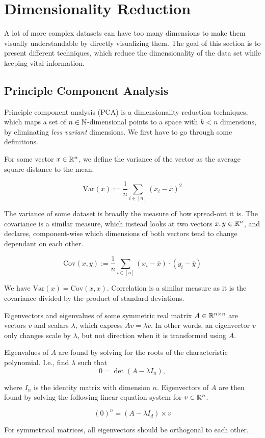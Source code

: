\section{Dimensionality Reduction}
A lot of more complex datasets can have too many dimensions to make them visually understandable by directly visualizing them.
The goal of this section is to present different techniques, which reduce the dimensionality of the data set while keeping vital information.

\subsection{Principle Component Analysis}
Principle component analysis (PCA) is a dimensionality reduction techniques, which maps a set of \(n \in \mathbb N\)-dimensional points to a space with \(k < n\) dimensions, by eliminating \emph{less variant} dimensions.
We first have to go through some definitions.

\newcommand{\Var}{\text{Var}}
\newcommand{\Cov}{\text{Cov}}

\begin{definition}
    For some vector \(x \in \mathbb R^n\), we define the variance of the vector as the average square distance to the mean.

    \[\Var(x) := \frac{1}{n}\sum_{i \in [n]} (x_i - \overline x)^2\]

    \noindent
    The variance of some dataset is broadly the measure of how spread-out it is.
    The covariance is a similar measure, which instead looks at two vectors \(x, y \in \mathbb R^n\), and declares, component-wise which dimensions of both vectors tend to change dependant on each other.

    \[\Cov(x, y) := \frac{1}{n}\sum_{i \in [n]} (x_i - \overline x) \cdot (y_i - \overline y)\]

    \noindent
    We have \(\Var(x) = \Cov(x,x)\).
    Correlation is a similar measure as it is the covariance divided by the product of standard deviations.
\end{definition}

\begin{definition}\label{def:eigen}
    Eigenvectors and eigenvalues of some symmetric real matrix \(A \in \mathbb R^{n \times n}\) are vectors \(v\) and scalars \(\lambda\), which express \(A v = \lambda v\).
    In other words, an eigenvector \(v\) only changes scale by \(\lambda\), but not direction when it is transformed using \(A\).

    Eigenvalues of \(A\) are found by solving for the roots of the characteristic polynomial.
    I.e., find \(\lambda\) such that \[0 = \det(A - \lambda I_n),\]
    
    \noindent
    where \(I_n\) is the identity matrix with dimension \(n\).
    Eigenvectors of \(A\) are then found by solving the following linear equation system for \(v \in \mathbb R^n\).

    \[(0)^n = (A - \lambda I_d) \times v\]

    \noindent
    For symmetrical matrices, all eigenvectors should be orthogonal to each other.
\end{definition}

